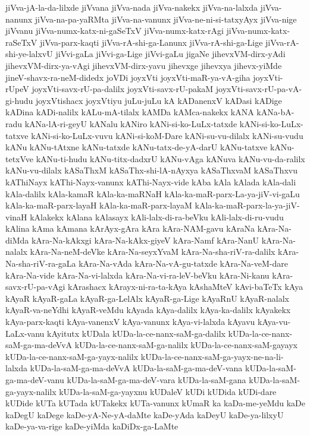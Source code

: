 {jiVva-jA-la-da-lilxde
jiVvana
jiVva-nada
jiVva-nakekx
jiVva-na-lalxda
jiVva-nanunx
jiVva-na-pa-yaRMta
jiVva-na-vanunx
jiVva-ne-ni-si-tatxyAyx
jiVva-nige
jiVvanu
jiVva-numx-katx-ni-gaSeTxV
jiVva-numx-katx-rAgi
jiVva-numx-katx-raSeTxV
jiVva-parx-kaqti
jiVva-rA-shi-ga-Lanunx
jiVva-rA-shi-ga-Lige
jiVva-rA-shi-ye-lalxvU
jiVvi-gaLa
jiVvi-ga-Lige
jiVvi-gaLu
jigaNe
jihevxVM-dirx-yAdi
jihevxVM-dirx-ya-vAgi
jihevxVM-dirx-yavu
jihevxge
jihevxya
jihevx-yiMde
jineV-shavx-ra-neM-didedx
joVDi
joyxVti
joyxVti-maR-ya-vA-giha
joyxVti-rUpeV
joyxVti-savx-rU-pa-dalilx
joyxVti-savx-rU-pakaM
joyxVti-savx-rU-pa-vA-gi-hudu
joyxVtishacx
joyxVtiyu
juLu-juLu
kA
kADanenxV
kADasi
kADige
kADina
kADi-nalilx
kALu-mA-tilalx
kAMDa
kAMca-nakekx
kANA
kANa-bA-radu
kANa-lA-ri-geyU
kANalu
kANiro
kANi-si-ko-LuLx-tatxde
kANi-si-ko-LuLx-tatxve
kANi-si-ko-LuLx-vuvu
kANi-si-koM-Dare
kANi-su-vu-dilalx
kANi-su-vudu
kANu
kANu-tAtxne
kANu-tatxde
kANu-tatx-de-yA-darU
kANu-tatxve
kANu-tetxVve
kANu-ti-hudu
kANu-titx-dadxrU
kANu-vAga
kANuva
kANu-vu-da-ralilx
kANu-vu-dilalx
kASaThxM
kASaThx-shi-lA-nAyxya
kASaThxvaM
kASaThxvu
kAThiNayx
kAThi-Nayx-vanunx
kAThi-Nayx-vide
kAba
kAla
kAlada
kAla-dali
kAla-dalilx
kAla-kamaR
kAla-ka-maRNaH
kAla-ka-maR-parx-La-ya-jiV-vi-gaLu
kAla-ka-maR-parx-layaH
kAla-ka-maR-parx-layaM
kAla-ka-maR-parx-la-ya-jiV-vinaH
kAlakekx
kAlana
kAlasayx
kAli-lalx-di-ra-beVku
kAli-lalx-di-ru-vudu
kAlina
kAma
kAmana
kArAyx-gAra
kAra
kAra-NAM-gavu
kAraNa
kAra-Na-diMda
kAra-Na-kAkxgi
kAra-Na-kAkx-giyeV
kAra-Namf
kAra-NanU
kAra-Na-nalalx
kAra-Na-neM-deVke
kAra-Na-seyxYvaM
kAra-Na-sha-riV-ra-dalilx
kAra-Na-sha-riV-ra-gaLa
kAra-Na-vAda
kAra-Na-vA-gu-tatxde
kAra-Na-veM-dare
kAra-Na-vide
kAra-Na-vi-lalxda
kAra-Na-vi-ra-leV-beVku
kAra-Ni-kanu
kAra-savx-rU-pa-vAgi
kArashacx
kArayx-ni-ra-ta-kAya
kAshaMteV
kAvi-baTeTx
kAya
kAyaR
kAyaR-gaLa
kAyaR-ga-LelAlx
kAyaR-ga-Lige
kAyaRnU
kAyaR-nalalx
kAyaR-va-neYdhi
kAyaR-veMdu
kAyada
kAya-dalilx
kAya-ka-dalilx
kAyakekx
kAya-parx-kaqti
kAya-vanenxV
kAya-vanunx
kAya-vi-lalxda
kAyavu
kAya-vu-LaLx-vanu
kAyitutx
kUDala
kUDa-la-ce-nanx-saM-ga-dalilx
kUDa-la-ce-nanx-saM-ga-ma-deVvA
kUDa-la-ce-nanx-saM-ga-nalilx
kUDa-la-ce-nanx-saM-gayayx
kUDa-la-ce-nanx-saM-ga-yayx-nalilx
kUDa-la-ce-nanx-saM-ga-yayx-ne-na-li-lalxda
kUDa-la-saM-ga-ma-deVvA
kUDa-la-saM-ga-ma-deV-vana
kUDa-la-saM-ga-ma-deV-vanu
kUDa-la-saM-ga-ma-deV-vara
kUDa-la-saM-gana
kUDa-la-saM-ga-yayx-nalilx
kUDa-la-saM-ga-yayxnu
kUDaleV
kUDi
kUDida
kUDi-dare
kUDide
kUTa
kUTada
kUTakekx
kUTa-vanunx
kUmaR
ka
kaDa-me-yeMdu
kaDe
kaDegU
kaDege
kaDe-yA-Ne-yA-daMte
kaDe-yAda
kaDeyU
kaDe-ya-lilxyU
kaDe-ya-va-rige
kaDe-yiMda
kaDiDx-ga-LaMte
}
